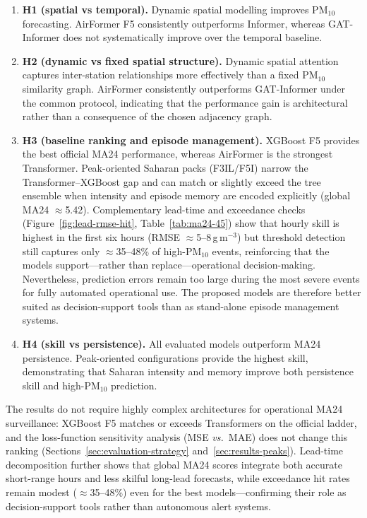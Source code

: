 \documentclass[11pt]{article}
\newcommand{\revnew}[1]{\textcolor{orange!75!black}{#1}}
\begin{document}
\begin{enumerate}[leftmargin=1.4em,itemsep=0.35em]
  \item \textbf{H1 (spatial vs temporal).} Dynamic spatial modelling improves PM$_{10}$ forecasting. AirFormer F5 consistently outperforms Informer, whereas GAT-Informer does not systematically improve over the temporal baseline.
  \item \textbf{H2 (dynamic vs fixed spatial structure).} Dynamic spatial attention captures inter-station relationships more effectively than a fixed PM$_{10}$ similarity graph. AirFormer consistently outperforms GAT-Informer under the common protocol, indicating that the performance gain is architectural rather than a consequence of the chosen adjacency graph.
  \item \textbf{H3 (baseline ranking and episode management).} XGBoost F5 provides the best official MA24 performance, whereas AirFormer is the strongest Transformer. \revnew{Peak-oriented Saharan packs (F3IL/F5I) narrow the Transformer--XGBoost gap and can match or slightly exceed the tree ensemble when intensity and episode memory are encoded explicitly (global MA24 $\approx$5.42).} \revnew{Complementary lead-time and exceedance checks (Figure~\ref{fig:lead-rmse-hit}, Table~\ref{tab:ma24-45}) show that hourly skill is highest in the first six hours (RMSE $\approx$5--8\,\textmu g\,m$^{-3}$) but threshold detection still captures only $\approx$35--48\% of high-PM$_{10}$ events, reinforcing that the models support---rather than replace---operational decision-making.} Nevertheless, prediction errors remain too large during the most severe events for fully automated operational use. The proposed models are therefore better suited as decision-support tools than as stand-alone episode management systems.
  \item \textbf{H4 (skill vs persistence).} All evaluated models outperform MA24 persistence. Peak-oriented configurations provide the highest skill, demonstrating that Saharan intensity and memory improve both persistence skill and high-PM$_{10}$ prediction.
\end{enumerate}

\revnew{The results do not require highly complex architectures for operational MA24 surveillance: XGBoost F5 matches or exceeds Transformers on the official ladder, and the loss-function sensitivity analysis (MSE \emph{vs.}\ MAE) does not change this ranking (Sections~\ref{sec:evaluation-strategy} and~\ref{sec:results-peaks}). Lead-time decomposition further shows that global MA24 scores integrate both accurate short-range hours and less skilful long-lead forecasts, while exceedance hit rates remain modest ($\approx$35--48\%) even for the best models---confirming their role as decision-support tools rather than autonomous alert systems.}
\end{document}
